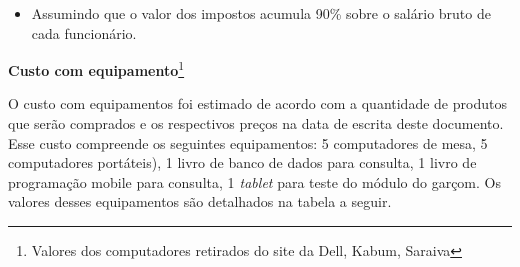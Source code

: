 \liststyleWWNumii
\begin{itemize}
\item \textcolor[rgb]{0.078431375,0.09411765,0.13725491}{Assumindo que o valor dos impostos acumula 90\% sobre o salário
bruto de cada funcionário.}
\end{itemize}

\bigskip

\textbf{\textcolor[rgb]{0.078431375,0.09411765,0.13725491}{Custo com equipamento}}\footnote{ Valores dos
computadores retirados do site da Dell, Kabum, Saraiva}

\textcolor[rgb]{0.078431375,0.09411765,0.13725491}{O custo com equipamentos foi estimado de acordo com a quantidade de
produtos que serão comprados e os respectivos preços na data de escrita deste documento. Esse custo compreende os
seguintes equipamentos: 5 computadores de mesa, 5 computadores portáteis), 1 livro de banco de dados para consulta, 1
livro de programação mobile para consulta, 1}\textit{\textcolor[rgb]{0.078431375,0.09411765,0.13725491}{
tablet}}\textcolor[rgb]{0.078431375,0.09411765,0.13725491}{ para teste do módulo do garçom. Os valores desses
equipamentos são detalhados na tabela a seguir.}


\bigskip

